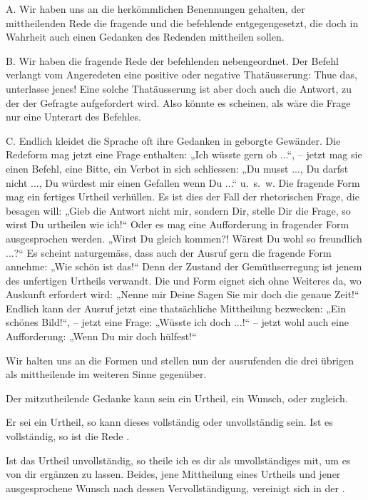 A. Wir haben uns an die herkömmlichen Benennungen gehalten, der mittheilenden Rede die fragende und die befehlende entgegengesetzt, die doch in Wahrheit auch einen Gedanken des Redenden mittheilen sollen.

B. Wir haben die fragende Rede der befehlenden nebengeordnet. Der Befehl verlangt vom Angeredeten eine positive oder negative Thatäusserung: Thue das, unterlasse jenes! Eine solche Thatäusserung ist aber doch auch die Antwort, zu der der Gefragte aufgefordert wird. Also könnte es scheinen, als wäre die Frage nur eine Unterart des Befehles.

\largerpage[1]C. Endlich kleidet die Sprache oft ihre Gedanken in geborgte Gewänder. Die  Redeform mag jetzt eine Frage enthalten: „Ich wüsste gern ob ...“, – jetzt mag sie einen Befehl, eine Bitte, ein Verbot in sich schliessen: „Du musst ..., Du darfst nicht ..., Du würdest mir einen Gefallen  wenn Du ...“ u.~s.~w. Die fragende Form mag ein fertiges Urtheil verhüllen. Es ist dies der Fall der rhetorischen Frage, die besagen will: „Gieb die Antwort nicht mir, sondern Dir, stelle Dir die Frage, so wirst Du urtheilen wie ich!“ Oder es mag eine Aufforderung in fragender Form ausgesprochen werden. „Wirst \label{sp.320} Du gleich kommen?! Wärest Du wohl so freundlich ...?“ Es scheint naturgemäss, dass auch der Ausruf gern die fragende Form annehme: „Wie schön ist das!“ Denn der Zustand der Gemüthserregung ist jenem des unfertigen Urtheils verwandt. Die  und  Form eignet sich ohne Weiteres da, wo Auskunft erfordert wird: \label{fp.311} „Nenne mir Deine  Sagen Sie mir doch die genaue Zeit!“ Endlich kann der Ausruf jetzt eine thatsächliche Mittheilung bezwecken: „Ein schönes Bild!“, – jetzt eine Frage: „Wüsste ich doch ...!“ – jetzt wohl auch eine Aufforderung: „Wenn Du mir doch hülfest!“ 

Wir halten uns an die Formen und stellen nun der ausrufenden die drei übrigen als mittheilende im weiteren Sinne gegenüber.

Der mitzutheilende Gedanke kann sein ein Urtheil, ein Wunsch, oder  zugleich.

Er sei ein Urtheil, so kann dieses vollständig oder unvollständig sein. Ist es vollständig, so ist die Rede .

Ist das Urtheil unvollständig, so theile ich es dir als unvollständiges mit, um es von dir ergänzen zu lassen. Beides, jene Mittheilung eines Urtheils und jener ausgesprochene Wunsch nach dessen Vervollständigung, vereinigt sich in der .

